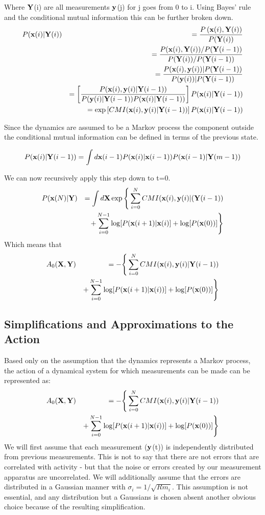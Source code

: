 \documentclass{scrartcl}
\newcommand{\be}{\begin{equation}}
\newcommand{\bea}{\begin{eqnarray}}
\newcommand{\ee}{\end{equation}}
\newcommand{\eea}{\end{eqnarray}}
\def\x{\mbox{{\bf x}}}
\def\Y{\mbox{$\bf{Y}$}}
\def\X{\mbox{$\bf{X}$}}
\def\y{\mbox{$\bf{y}$}}
\begin{document}
Where \Y(i) are all measurements \y(j) for  j goes from 0 to i.  Using Bayes' rule and the conditional mutual information \cite{fano} this can be further broken down.
\bea
&P(\x(i)|\Y(i)) & =  \frac{P\left( \x(i), \Y(i)\right)}{P(\Y(i))} \nonumber \\
&& = \frac{P(\x(i),\Y(i))/P(\Y(i-1))}{P(\Y(i))/P(\Y(i-1))}\nonumber \\
&& = \frac{P(\x(i),\y(i))|P(\Y(i-1))}{P(\y(i))|P(\Y(i-1))}\nonumber \\
&& = \left[\frac{P(\x(i),\y(i)|\Y(i-1))}{P(\y(i)|\Y(i-1))P(\x(i)|\Y(i-1))}\right] P(\x(i)|\Y(i-1)) \nonumber \\
&& = \exp \left[CMI(\x(i),\y(i)|\Y(i-1))\right] P(\x(i)|\Y(i-1))
\eea

Since the dynamics are assumed to be a Markov process the component outside the conditional mutual information can be defined in terms of the previous state.

\be
P(\x(i)|\Y(i-1)) = \int d\x(i-1) P(\x(i)|\x(i-1))P(\x(i-1)|\Y(m-1))
\ee

We can now recursively apply this step down to t=0.
\bea
&P(\x(N)|\Y) &= \int d\X \exp \Bigg\{ \sum_{i=0}^{N} CMI(\x(i),\y(i)|(\Y(i-1)) \nonumber \\
&&+  \sum_{i=0}^{N-1} \log[P(\x(i+1)|\x(i)] + \log[P(\x(0))] \Bigg\} 
\eea
Which means that
\bea
&A_0(\X,\Y) &= - \Bigg\{\sum_{i=0}^{N}CMI(\x(i),\y(i)|\Y(i-1))\nonumber\\
&&+ \sum_{i=0}^{N-1} \log[P(\x(i+1)|\x(i))] + \log[P(\x(0))] \Bigg\}
\eea


\subsection*{Simplifications and Approximations to the Action}

Based only on the assumption that the dynamics represents a Markov process, the action of a dynamical system for which measurements can be made can be represented as:
\bea
&A_0(\X,\Y) &= - \Bigg\{\sum_{i=0}^{N}CMI(\x(i),\y(i)|\Y(i-1))\nonumber\\
&&+ \sum_{i=0}^{N-1} \log[P(\x(i+1)|\x(i))] + \log[P(\x(0))] \Bigg\}
\eea
We will first assume that each measurement (\y(t)) is independently distributed from previous measurements.  This is not to say that there are not errors that are correlated with activity - but that the noise or errors created by our measurement apparatus are uncorrelated.  We will additionally assume that the errors are distributed in a Gaussian manner with $\sigma_i = 1/\sqrt{Rm_i}$.  This assumption is not essential, and any distribution but a Gaussians is chosen absent another obvious choice because of the resulting simplification.\\
\end{document}
